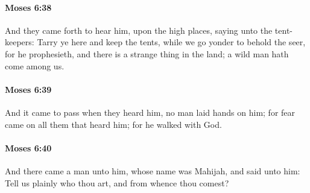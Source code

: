 		\paragraph{Moses 6:38} %
			\label{MOSES-6-38}

			And they came forth to hear him, upon the high places, saying unto the tent-keepers: Tarry ye here and keep the tents, while we go yonder to behold the seer, for he prophesieth, and there is a strange thing in the land; a wild man hath come among us.


		\paragraph{Moses 6:39} %
			\label{MOSES-6-39}

			And it came to pass when they heard him, no man laid hands on him; for fear came on all them that heard him; for he walked with God.


		\paragraph{Moses 6:40} %
			\label{MOSES-6-40}

			And there came a man unto him, whose name was Mahijah, and said unto him: Tell us plainly who thou art, and from whence thou comest?


